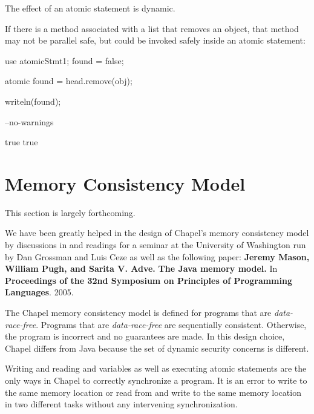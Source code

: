 The effect of an atomic statement is dynamic.

\begin{example}
If there is a method associated with a list that removes an object,
that method may not be parallel safe, but could be invoked safely inside an
atomic statement:
\begin{chapelpre}
use atomicStmt1;
found = false;
\end{chapelpre}
\begin{chapel}
atomic found = head.remove(obj);
\end{chapel}
\begin{chapelpost}
writeln(found);
\end{chapelpost}
\begin{chapelcompopts}
--no-warnings
\end{chapelcompopts}
\begin{chapeloutput}
true
true
\end{chapeloutput}
\end{example}

\section{Memory Consistency Model}
\label{Memory_Consistency}

\begin{openissue}
This section is largely forthcoming.
\end{openissue}

We have been greatly helped in the design of Chapel's memory
consistency model by discussions in and readings for a seminar at the
University of Washington run by Dan Grossman and Luis Ceze as well as
the following paper: {\bf Jeremy Mason, William Pugh, and Sarita
V. Adve.}  {\bf The Java memory model.}  In {\bf Proceedings of the
32nd Symposium on Principles of Programming Languages}.  2005.

The Chapel memory consistency model is defined for programs that are
{\em data-race-free}.  Programs that are {\em data-race-free} are
sequentially consistent.  Otherwise, the program is incorrect and no
guarantees are made.  In this design choice, Chapel differs from Java
because the set of dynamic security concerns is different.

Writing and reading  and  variables as well as
executing atomic statements are the only ways in Chapel to correctly
synchronize a program.  It is an error to write to the same memory
location or read from and write to the same memory location in two
different tasks without any intervening synchronization.

